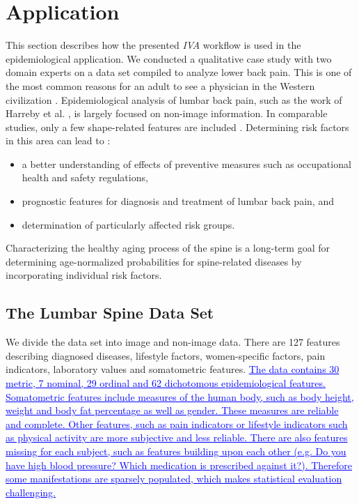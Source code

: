 \documentclass[journal]{style/vgtc} 			          %
\newcommand{\add}[1]{\textcolor{blue}{\uline{#1}}}
\begin{document}
\section{Application} \label{application}
This section describes how the presented \emph{IVA} workflow is used in the epidemiological application.
%
We conducted a qualitative case study with two domain experts on a data set compiled to analyze lower back pain. 
%
This is one of the most common reasons for an adult to see a physician in the Western civilization \cite{Backpain}.
%
Epidemiological analysis of lumbar back pain, such as the work of Harreby et al. \cite{Harreby1996}, is largely focused on non-image information.
%
In comparable studies, only a few shape-related features are included \cite{Lang2011}.
%
%
Determining risk factors in this area can lead to \cite{Fletcher2012}:
\begin{itemize}
	\item a better understanding of effects of preventive measures such as occupational health and safety regulations,
	\item prognostic features for diagnosis and treatment of lumbar back pain, and
	\item determination of particularly affected risk groups.
\end{itemize}
%
Characterizing the healthy aging process of the spine is a long-term goal for determining age-normalized probabilities for spine-related diseases by incorporating individual risk factors.
%
\subsection{The Lumbar Spine Data Set}
We divide the data set into image and non-image data.
%
There are 127 features describing diagnosed diseases, lifestyle factors, women-specific factors, pain indicators, laboratory values and somatometric features.
%
\add{The data contains 30 metric, 7 nominal, 29 ordinal and 62 dichotomous epidemiological features.
%
Somatometric features include measures of the human body, such as body height, weight and body fat percentage as well as gender.
%
These measures are reliable and complete.
%
Other features, such as pain indicators or lifestyle indicators such as physical activity are more subjective and less reliable.
%
There are also features missing for each subject, such as features building upon each other (e.g. Do you have high blood pressure? Which medication is prescribed against it?).
%
Therefore some manifestations are sparsely populated, which makes statistical evaluation challenging.
%
}
%
\end{document}
